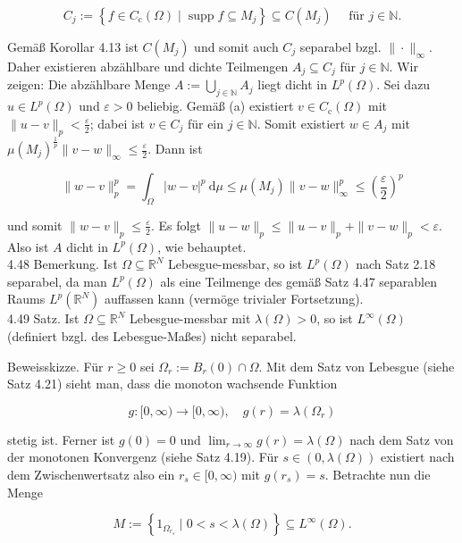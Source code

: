 \documentclass[10pt, letterpaper]{article}
\begin{document}
$$
C_{j}:=\left\{f \in C_{\mathrm{c}}(\Omega) \mid \operatorname{supp} f \subseteq M_{j}\right\} \subseteq C\left(M_{j}\right) \quad \text { für } j \in \mathbb{N} .
$$

Gemäß Korollar 4.13 ist $C\left(M_{j}\right)$ und somit auch $C_{j}$ separabel bzgl. $\|\cdot\|_{\infty}$. Daher existieren abzählbare und dichte Teilmengen $A_{j} \subseteq C_{j}$ für $j \in \mathbb{N}$. Wir zeigen: Die abzählbare Menge $A:=\bigcup_{j \in \mathbb{N}} A_{j}$ liegt dicht in $L^{p}(\Omega)$. Sei dazu $u \in L^{p}(\Omega)$ und $\varepsilon>0$ beliebig. Gemäß (a) existiert $v \in C_{\mathrm{c}}(\Omega)$ mit $\|u-v\|_{p}<\frac{\varepsilon}{2}$; dabei ist $v \in C_{j}$ für ein $j \in \mathbb{N}$. Somit existiert $w \in A_{j}$ mit $\mu\left(M_{j}\right)^{\frac{1}{p}}\|v-w\|_{\infty} \leq \frac{\varepsilon}{2}$. Dann ist

$$
\|w-v\|_{p}^{p}=\int_{\Omega}|w-v|^{p} \mathrm{~d} \mu \leq \mu\left(M_{j}\right)\|v-w\|_{\infty}^{p} \leq\left(\frac{\varepsilon}{2}\right)^{p}
$$

und somit $\|w-v\|_{p} \leq \frac{\varepsilon}{2}$. Es folgt $\|u-w\|_{p} \leq\|u-v\|_{p}+\|v-w\|_{p}<\varepsilon$. Also ist $A$ dicht in $L^{p}(\Omega)$, wie behauptet.\\
4.48 Bemerkung. Ist $\Omega \subseteq \mathbb{R}^{N}$ Lebesgue-messbar, so ist $L^{p}(\Omega)$ nach Satz 2.18 separabel, da man $L^{p}(\Omega)$ als eine Teilmenge des gemäß Satz 4.47 separablen Raums $L^{p}\left(\mathbb{R}^{N}\right)$ auffassen kann (vermöge trivialer Fortsetzung).\\
4.49 Satz. Ist $\Omega \subseteq \mathbb{R}^{N}$ Lebesgue-messbar mit $\lambda(\Omega)>0$, so ist $L^{\infty}(\Omega)$ (definiert bzgl. des Lebesgue-Maßes) nicht separabel.

Beweisskizze. Für $r \geq 0$ sei $\Omega_{r}:=B_{r}(0) \cap \Omega$. Mit dem Satz von Lebesgue (siehe Satz 4.21) sieht man, dass die monoton wachsende Funktion

$$
g:[0, \infty) \rightarrow[0, \infty), \quad g(r)=\lambda\left(\Omega_{r}\right)
$$

stetig ist. Ferner ist $g(0)=0$ und $\lim _{r \rightarrow \infty} g(r)=\lambda(\Omega)$ nach dem Satz von der monotonen Konvergenz (siehe Satz 4.19). Für $s \in(0, \lambda(\Omega))$ existiert nach dem Zwischenwertsatz also ein $r_{s} \in[0, \infty)$ mit $g\left(r_{s}\right)=s$. Betrachte nun die Menge

$$
M:=\left\{1_{\Omega_{r_{s}}} \mid 0<s<\lambda(\Omega)\right\} \subseteq L^{\infty}(\Omega) .
$$
\end{document}
